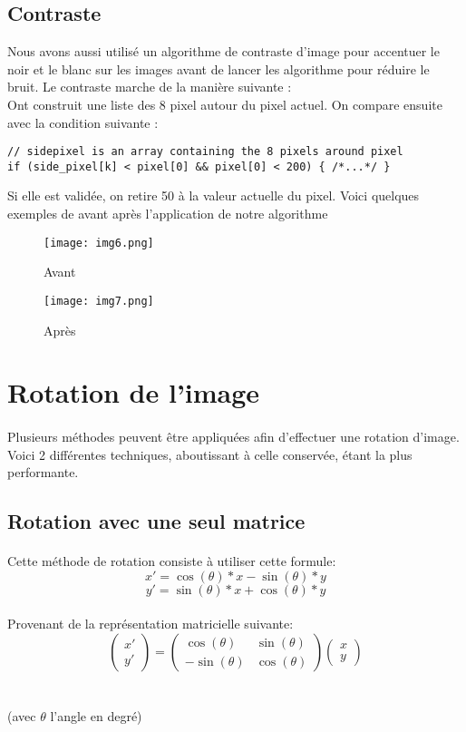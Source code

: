 \documentclass{article}
\begin{document}
\subsection{Contraste}
Nous avons aussi utilisé un algorithme de contraste d’image pour accentuer le noir et le blanc sur les images avant de lancer les algorithme pour réduire le bruit. Le contraste marche de la manière suivante :\\
Ont construit une liste des 8 pixel autour du pixel actuel. On compare ensuite avec la condition suivante :
\begin{lstlisting}
// sidepixel is an array containing the 8 pixels around pixel
if (side_pixel[k] < pixel[0] && pixel[0] < 200) { /*...*/ }
\end{lstlisting}
Si elle est validée, on retire 50 à la valeur actuelle du pixel. 
Voici quelques exemples de avant après l’application de notre algorithme
\begin{figure}[H]
    \centering
    \texttt{[image: img6.png]}
    \caption{Avant}
    \texttt{[image: img7.png]}
    \caption{Après}
\end{figure}
\section{Rotation de l'image}
\paragraph{}
Plusieurs méthodes peuvent être appliquées afin d’effectuer une rotation d’image. Voici 2 différentes techniques, aboutissant à celle conservée, étant la plus performante.
\subsection{Rotation avec une seul matrice}
\paragraph{}
Cette méthode de rotation consiste à utiliser cette formule:
$$
x' = \cos(\theta) * x - \sin(\theta) * y
$$
$$
y' = \sin(\theta) * x + \cos(\theta) * y
$$
\paragraph{}
Provenant de la représentation matricielle suivante:\\

$$\left( \begin{array}{cc} x' \\ y'\end{array}\right) = \left( \begin{array}{cc} \cos(\theta) & \sin(\theta) \\ -\sin(\theta) & \cos(\theta) \end{array}\right)\left(\begin{array}{cc} x \\ y\end{array}\right)$$ 
\\\\
(avec $\theta$  l’angle en degré)
\end{document}
